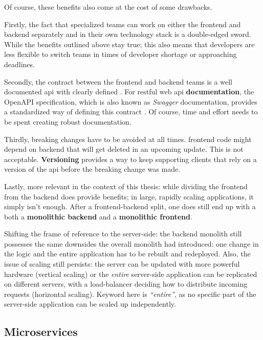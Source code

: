 Of course, these benefits also come at the cost of some drawbacks. 

Firstly, the fact that specialized teams can work on either the \gls{frontend}
and \gls{backend} separately and in their own technology stack is a double-edged
sword. While the benefits outlined above stay true; this also means that
developers are less flexible to switch teams in times of developer shortage or
approaching deadlines.

Secondly, the contract between the \gls{frontend} and \gls{backend} teams is a
well documented \gls{api} with clearly defined . For \gls{restful}
web \gls{api} \textbf{documentation}, the OpenAPI
specification, which is also known as
\textit{Swagger} documentation, provides a standardized way of defining this
contract \autocite{Koren_Klamma_2018}. Of course, time and effort needs to be
spent creating robust documentation. 

Thirdly, breaking changes have to be avoided at all times. \Gls{frontend} code
might depend on \gls{backend}  that will get deleted in an
upcoming update. This is not acceptable.
\textbf{Versioning} provides a
way to keep supporting clients that rely on a version of the \gls{api} before
the breaking change was made.

Lastly, more relevant in the context of this thesis: while dividing the
\gls{frontend} from the \gls{backend} does provide benefits; in large, rapidly
scaling applications, it simply isn't enough. After a
\gls{frontend}-\gls{backend} split, one does still end up with a both a
\textbf{\gls{monolithic} \gls{backend}} and a \textbf{\gls{monolithic}
\gls{frontend}}. 

Shifting the frame of reference to the server-side: the \gls{backend}
\gls{monolith} still possesses the same downsides the overall \gls{monolith} had
introduced: one change in the logic and the entire application has to be
rebuilt and redeployed. Also, the issue of scaling still persists: the server
can be updated with more powerful hardware (vertical scaling) or the \textit{entire}
server-side application can be replicated on different servers, with a
\gls{load-balancer} deciding how to distribute incoming requests (horizontal scaling).
Keyword here is \textit{``entire''}, as no specific part of the server-side
application can be scaled up independently. 


\subsection{Microservices} 
\label{ssec:microservices}

